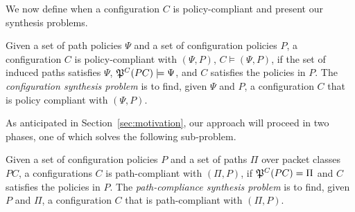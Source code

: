 



\noindent We now define when a configuration $C$ is policy-compliant
and present our synthesis problems.
\begin{definition} \label{def:policycompliance}
	Given a set of path policies $\Psi$ and a set of configuration policies $P$,
	a configuration $C$ is policy-compliant with $(\Psi,P)$,
	$C \models (\Psi,P)$, if the set of
	induced paths satisfies $\Psi$, $\mathfrak{P}^C(PC) \models \Psi$,
	and $C$ satisfies the policies in $P$.
	The \emph{configuration synthesis problem} is to find, given $\Psi$ and $P$,
a configuration $C$ that is policy compliant with $(\Psi,P)$.
\end{definition}

As anticipated in Section~\ref{sec:motivation}, our approach will proceed in two phases,
one of which solves the following sub-problem.  
\begin{definition} \label{def:pathcompliance}
Given a set of configuration policies $P$
and a set of paths $\Pi$ over packet classes $PC$,
	a configurations $C$ is path-compliant with 
	$(\Pi,P)$,
	if $\mathfrak{P}^C(PC)=\Pi$ and $C$ satisfies the policies in $P$.
	The \emph{path-compliance synthesis problem} is to find, given $P$ and $\Pi$,
a configuration $C$ that is path-compliant with $(\Pi,P)$.
\end{definition}



